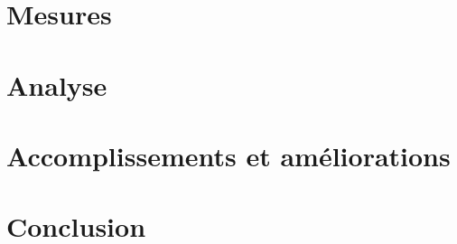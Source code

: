 \documentclass[
    mi, %
,table]{heig-tb}
\begin{document}
\chapter{Mesures}


\chapter{Analyse}


\chapter{Accomplissements et améliorations}


\chapter{Conclusion}





\clearpage
%

\printbibliography

\appendix


\addappheadtotoc



\let\cleardoublepage\clearpage
\backmatter

\label{glossaire}
\printnoidxglossary
\label{index}
\printindex

%
\end{document}
